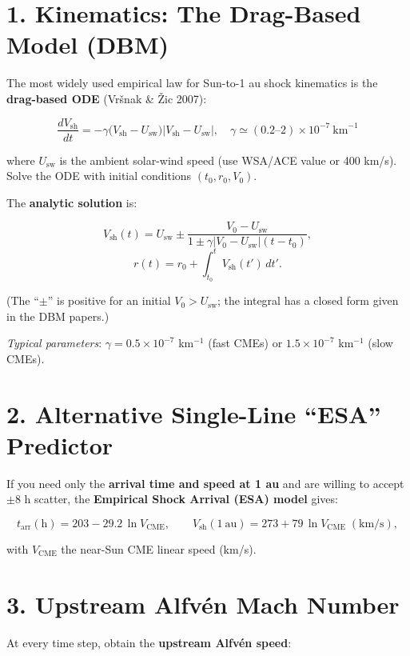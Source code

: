 \section*{1. Kinematics: The Drag-Based Model (DBM)}

The most widely used empirical law for Sun-to-1 au shock kinematics is the \textbf{drag-based ODE} (Vršnak \& Žic 2007):

\[
\boxed{
\frac{dV_{\text{sh}}}{dt} = -\gamma \bigl(V_{\text{sh}} - U_{\text{sw}}\bigr) \bigl| V_{\text{sh}} - U_{\text{sw}} \bigr|,
\quad \gamma \simeq (0.2\text{–}2) \times 10^{-7}\ \text{km}^{-1}
}
\]

where $U_{\text{sw}}$ is the ambient solar-wind speed (use WSA/ACE value or 400 km/s). Solve the ODE with initial conditions $(t_0, r_0, V_0)$.

The \textbf{analytic solution} is:

\[
V_{\text{sh}}(t) = U_{\text{sw}} \pm \frac{V_0 - U_{\text{sw}}}{1 \pm \gamma |V_0 - U_{\text{sw}}| (t - t_0)},
\]
\[
r(t) = r_0 + \int_{t_0}^{t} V_{\text{sh}}(t')\,dt'.
\]

(The ``$\pm$'' is positive for an initial $V_0 > U_{\text{sw}}$; the integral has a closed form given in the DBM papers.)

\textit{Typical parameters}: $\gamma = 0.5 \times 10^{-7}$ km$^{-1}$ (fast CMEs) or $1.5 \times 10^{-7}$ km$^{-1}$ (slow CMEs).

\hrulefill

\section*{2. Alternative Single-Line ``ESA'' Predictor}

If you need only the \textbf{arrival time and speed at 1 au} and are willing to accept $\pm 8$ h scatter, the \textbf{Empirical Shock Arrival (ESA) model} gives:

\[
t_{\mathrm{arr}}(\text{h}) = 203 - 29.2\,\ln V_{\text{CME}},
\qquad
V_{\text{sh}}(1\ \mathrm{au}) = 273 + 79\,\ln V_{\text{CME}}\;(\text{km/s}),
\]

with $V_{\text{CME}}$ the near-Sun CME linear speed (km/s).

\hrulefill

\section*{3. Upstream Alfvén Mach Number}

At every time step, obtain the \textbf{upstream Alfvén speed}:

